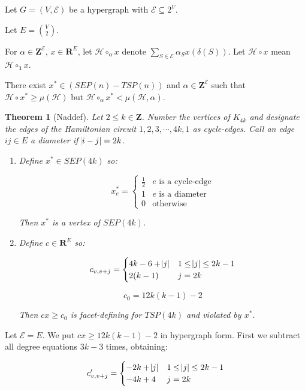 \documentclass{article}
\newtheorem{theorem}{Theorem}
\begin{document}
Let $G=(V, \mathcal{E})$ be a hypergraph with $\mathcal{E}\subseteq 2^V$.

Let $E = {V\choose 2}$.

For $\alpha\in\mathbf{Z}^{\mathcal{E}}$, $x\in \mathbf{R}^{E}$, let
$\mathcal{H}\circ_\alpha x$ denote $ \sum_{S\in \mathcal{E}}\alpha_S x(\delta(S))$.
Let $\mathcal{H}\circ x$ mean $\mathcal{H}\circ_\mathbf{1} x$.

There exist $x^* \in (SEP(n) - TSP(n))$ and $\alpha\in\mathbf{Z}^{\mathcal{E}}$
such that $\mathcal{H}\circ x^* \geq \mu(\mathcal{H})$ but
$\mathcal{H}\circ_\alpha x^* < \mu(\mathcal{H}, \alpha)$.

\begin{theorem}[Naddef]
Let $2\leq k\in \mathbf{Z}$. Number the vertices of $K_{4k}$ and designate
the edges of the Hamiltonian circuit $1,2,3,\cdots ,4k,1$ as \emph{cycle-edges}.
Call an edge $ij \in E$ a \emph{diameter} if $\abs{i-j} = 2k$.

\begin{enumerate}
\item Define $x^* \in SEP(4k)$ so:

$$x_{e}^*=\begin{cases}
\frac{1}{2} & \text{$e$ is a cycle-edge} \\
1 & \text{$e$ is a diameter} \\
0 & \text{otherwise}
\end{cases}$$

Then $x^*$ is a vertex of $SEP(4k)$.

\item Define $c\in\mathbf{R}^E$ so:

$$c_{v,v+j} = \begin{cases}
4k-6+\abs{j} & 1\leq\abs{j}\leq 2k-1 \\
2(k-1) & j=2k
\end{cases}$$

$$c_0 = 12k(k-1)-2$$

Then $cx\geq c_0$ is facet-defining for $TSP(4k)$
and violated by $x^*$.
\end{enumerate}
\end{theorem}

Let $\mathcal{E} = E$. We put $cx\geq 12k(k-1)-2$ in hypergraph form. 
First we subtract all degree equations $3k-3$ times, obtaining:


$$c'_{v,v+j}=\begin{cases}
-2k+\abs{j} & 1\leq\abs{j}\leq 2k-1 \\
-4k+4 & j=2k
\end{cases}$$
\end{document}
